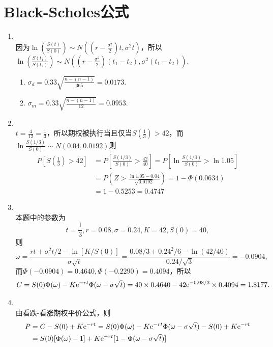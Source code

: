\section{Black-Scholes公式}
\begin{enumerate}[label=\arabic{section}.\arabic*]
    \item \sol\\
    因为$\displaystyle \ln\left(\frac{S(t)}{S(0)}\right) \sim N\left(\left(r-\frac{\sigma^2}{2}\right)t,\sigma^2t\right)$，所以$\displaystyle \ln\left(\frac{S(t_1)}{S(t_2)}\right) \sim N\left(\left(r-\frac{\sigma^2}{2}\right)(t_1-t_2),\sigma^2(t_1-t_2)\right)$.
    \begin{enumerate}[label=\alph*)]
        \item $\displaystyle \sigma_d=0.33\sqrt{\frac{n-(n-1)}{365}}=0.0173$.
        \item $\displaystyle \sigma_m=0.33\sqrt{\frac{n-(n-1)}{12}}=0.0953$.
    \end{enumerate}
    \item \sol\\
    $\displaystyle t=\frac{4}{12}=\frac{1}{3}$，所以期权被执行当且仅当$\displaystyle S\left(\frac{1}{3}\right)>42$，而$\displaystyle \ln\frac{S(1/3)}{S(0)} \sim N\left(0.04,0.0192\right)$则
    \begin{align*}
        P\left[S\left(\frac{1}{3}\right)>42\right]&=P\left[\frac{S(1/3)}{S(0)}>\frac{42}{40}\right]=P\left[\ln\frac{S(1/3)}{S(0)}>\ln1.05\right]\\
        &=P\left(Z>\frac{\ln1.05-0.04}{\sqrt{0.0192}}\right)=1-\Phi(0.0634)\\
        &=1-0.5253=0.4747
    \end{align*}
    \item \sol\\
    本题中的参数为\[t=\frac{1}{3},r=0.08,\sigma=0.24,K=42,S(0)=40,\]
    则\[\omega=\frac{rt+\sigma^2t/2-\ln[K/S(0)]}{\sigma\sqrt{t}}=\frac{0.08/3+0.24^2/6-\ln(42/40)}{0.24/\sqrt{3}}=-0.0904,\]
    而$\Phi(-0.0904)=0.4640,\Phi(-0.2290)=0.4094$，所以
    \[C=S(0)\Phi(\omega)-K\mathrm{e}^{-rt}\Phi(\omega-\sigma\sqrt{t})=40\times0.4640-42\mathrm{e}^{-0.08/3}\times0.4094=1.8177.\]
    \item \sol\\
    由看跌-看涨期权平价公式，则
    \begin{align*}
        P&=C-S(0)+K\e^{-rt}=S(0)\Phi(\omega)-K\e^{-rt}\Phi(\omega-\sigma\sqrt{t})-S(0)+K\e^{-rt}\\
        &=S(0)[\Phi(\omega)-1]+K\e^{-rt}[1-\Phi(\omega-\sigma\sqrt{t})]

\end{align*}
\end{enumerate}
